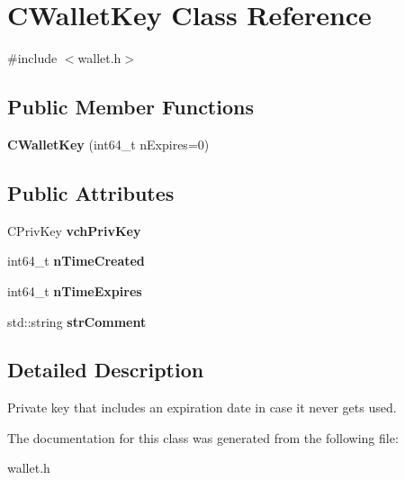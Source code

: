 \hypertarget{class_c_wallet_key}{}\section{C\+Wallet\+Key Class Reference}
\label{class_c_wallet_key}


{\ttfamily \#include $<$wallet.\+h$>$}

\subsection*{Public Member Functions}
\begin{DoxyCompactItemize}
\item 
\mbox{\label{class_c_wallet_key_aa2603825b543b1d5153f31482139a6b2}} 
{\bfseries C\+Wallet\+Key} (int64\+\_\+t n\+Expires=0)
\end{DoxyCompactItemize}
\subsection*{Public Attributes}
\begin{DoxyCompactItemize}
\item 
\mbox{\label{class_c_wallet_key_a28f9bbffcc9d7f2f784d5e4be8ca31f7}} 
C\+Priv\+Key {\bfseries vch\+Priv\+Key}
\item 
\mbox{\label{class_c_wallet_key_a08e4bb5bbb690f478e3f464fdc6f26c2}} 
int64\+\_\+t {\bfseries n\+Time\+Created}
\item 
\mbox{\label{class_c_wallet_key_a53b6c0e78341dae728724a35dc88e258}} 
int64\+\_\+t {\bfseries n\+Time\+Expires}
\item 
\mbox{\label{class_c_wallet_key_aa8804f64837126c6a28c27178eb8c220}} 
std\+::string {\bfseries str\+Comment}
\end{DoxyCompactItemize}


\subsection{Detailed Description}
Private key that includes an expiration date in case it never gets used. 

The documentation for this class was generated from the following file\+:\begin{DoxyCompactItemize}
\item 
wallet.\+h\end{DoxyCompactItemize}
